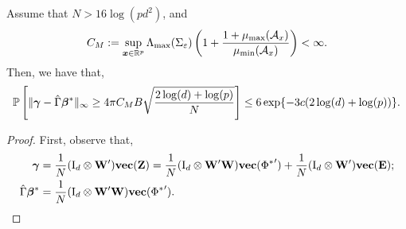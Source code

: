 \begin{prop}\label{prop:errorbound_whp}
    Assume that $N > 16\log(pd^2)$, and 
    \begin{equation}
        C_M := \sup_{\bm{x}\in\mathbb{R}^p}  \Lambda_{\max}(\Sigma_\varepsilon) \left( 1 + \frac{1 + \mu_{\max}(\mathcal{A}_x)} {\mu_{\min}(\mathcal{A}_x)} \right) < \infty.
    \end{equation}
    Then, we have that,
    \begin{equation*}
        \mathbb{P}\left[ \|\bm{\gamma} - \hat\Gamma \bm{\beta}^*\|_\infty  \geq 4\pi C_M B \sqrt{\frac{2\log(d) + \log(p)}{N}} \right] \leq 6\exp\{ -3c (2\log(d) + \log(p)) \}.
    \end{equation*}
\end{prop}
\begin{proof}
    First, observe that,
    \begin{align*}
        \bm{\gamma} &= \frac{1}{N} (\mathrm{I}_d \otimes \mathbf{W}') \textbf{vec}(\mathbf{Z}) = \frac{1}{N} (\mathrm{I}_d \otimes \mathbf{W}'\mathbf{W}) \textbf{vec}({\Phi^{*}}') + \frac{1}{N}(\mathrm{I}_d \otimes \mathbf{W}') \textbf{vec}(\mathbf{E});\\
        \hat\Gamma \bm{\beta}^* &= \frac{1}{N} (\mathrm{I}_d \otimes \mathbf{W}'\mathbf{W}) \textbf{vec}({\Phi^{*}}').
    \end{align*}
    

\end{proof}
